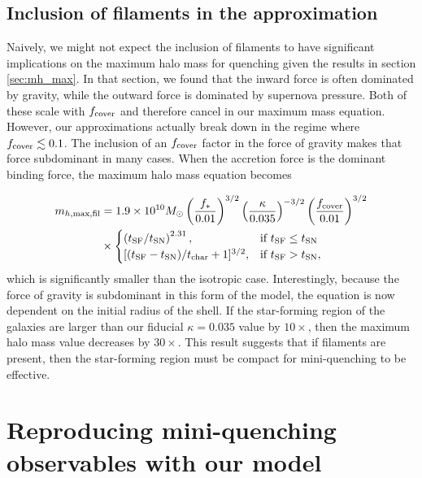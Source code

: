 \documentclass[a4paper,11pt]{article}
\begin{document}
\subsection{Inclusion of filaments in the approximation} \label{sec:mh_max_filaments}

Naively, we might not expect the inclusion of filaments to have significant implications on the maximum halo mass for quenching given the results in section \ref{sec:mh_max}. In that section, we found that the inward force is often dominated by gravity, while the outward force is dominated by supernova pressure. Both of these scale with $f_{\rm cover}$ and therefore cancel in our maximum mass equation. However, our approximations actually break down in the regime where $f_{\rm cover} \lesssim 0.1$. The inclusion of an $f_{\rm cover}$ factor in the force of gravity makes that force subdominant in many cases. When the accretion force is the dominant binding force, the maximum halo mass equation becomes

\begin{align}
m_{h, \rm max, fil} & = 1.9 \times 10^{10} M_{\odot} \left( \frac{f_{*}}{0.01} \right)^{3/2} \left( \frac{\kappa}{0.035} \right)^{-3/2} \left( \frac{f_{\rm cover}}{0.01} \right)^{3/2} \\
    & \times 
    \begin{cases}
        \left( t_{\rm SF} / t_{\rm SN} \right)^{2.31}, & \text{if } t_{\rm SF} \leq t_{\rm SN} \\
        [(t_{\rm SF} - t_{\rm SN})/t_{\rm char} + 1]^{3/2},  & \text{if } t_{\rm SF} > t_{\rm SN},
    \end{cases} \label{eq:mh_max_fil}
\end{align}
%
which is significantly smaller than the isotropic case. Interestingly, because the force of gravity is subdominant in this form of the model, the equation is now dependent on the initial radius of the shell. If the star-forming region of the galaxies are larger than our fiducial $\kappa = 0.035$ value by $10 \times$, then the maximum halo mass value decreases by $30 \times$. This result suggests that if filaments are present, then the star-forming region must be compact for mini-quenching to be effective.

\section{Reproducing mini-quenching observables with our model} \label{sec:quenching_timescale}
\end{document}
